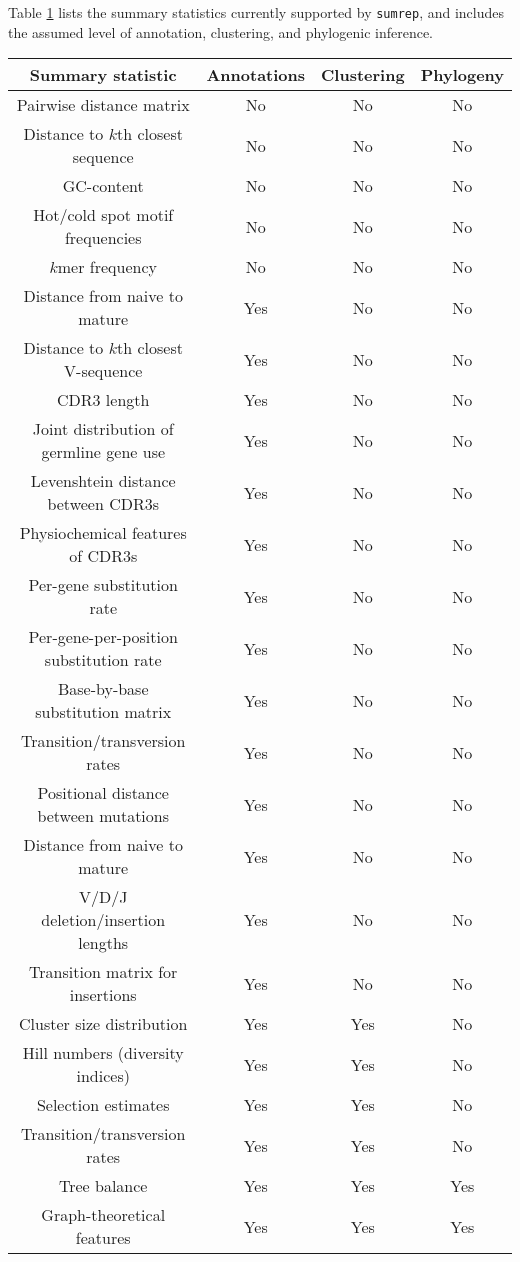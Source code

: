\documentclass{article}
\begin{document}
Table \ref{tab:SummaryStatistics} lists the summary statistics currently supported by \texttt{sumrep}, and includes the assumed level of annotation, clustering, and phylogenic inference.
\begin{table}
\begin{tabular}{c|c|c|c}
Summary statistic & Annotations & Clustering & Phylogeny
\\
\hline \hline
Pairwise distance matrix & No & No & No \\
Distance to $k$th closest sequence & No & No & No \\
GC-content & No & No & No \\
Hot/cold spot motif frequencies & No & No & No \\
$k$mer frequency & No & No & No \\
\hline
Distance from naive to mature & Yes & No & No \\
Distance to $k$th closest V-sequence & Yes & No & No \\
CDR3 length & Yes & No & No \\
Joint distribution of germline gene use & Yes & No & No \\
Levenshtein distance between CDR3s & Yes & No & No \\
Physiochemical features of CDR3s & Yes & No & No \\
Per-gene substitution rate & Yes & No & No \\
Per-gene-per-position substitution rate & Yes & No & No \\
Base-by-base substitution matrix & Yes & No & No \\
Transition/transversion rates & Yes & No & No \\
Positional distance between mutations & Yes & No & No \\
Distance from naive to mature & Yes & No & No \\
V/D/J deletion/insertion lengths & Yes & No & No \\
Transition matrix for insertions & Yes & No & No \\
\hline
Cluster size distribution & Yes & Yes & No \\
Hill numbers (diversity indices) & Yes & Yes & No \\
Selection estimates & Yes & Yes & No \\
Transition/transversion rates & Yes & Yes & No \\
\hline
Tree balance & Yes & Yes & Yes \\
Graph-theoretical features & Yes & Yes & Yes \\
\end{tabular}
\label{tab:SummaryStatistics}
\end{table}
\end{document}
